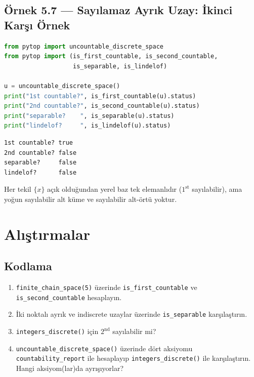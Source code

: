 \subsection*{Örnek 5.7 — Sayılamaz Ayrık Uzay: İkinci Karşı Örnek}

\begin{lstlisting}[language=Python]
from pytop import uncountable_discrete_space
from pytop import (is_first_countable, is_second_countable,
                   is_separable, is_lindelof)

u = uncountable_discrete_space()
print("1st countable?", is_first_countable(u).status)
print("2nd countable?", is_second_countable(u).status)
print("separable?    ", is_separable(u).status)
print("lindelof?     ", is_lindelof(u).status)
\end{lstlisting}

\begin{verbatim}
1st countable? true
2nd countable? false
separable?     false
lindelof?      false
\end{verbatim}

Her tekil $\{x\}$ açık olduğundan yerel baz tek elemanlıdır ($1^{\text{st}}$
sayılabilir), ama yoğun sayılabilir alt küme ve sayılabilir alt-örtü yoktur.

\section{Alıştırmalar}

\subsection*{Kodlama}

\begin{enumerate}[label=K\arabic*.]
\item \texttt{finite\_chain\_space(5)} üzerinde \texttt{is\_first\_countable} ve
      \texttt{is\_second\_countable} hesaplayın.
\item İki noktalı ayrık ve indiscrete uzaylar üzerinde \texttt{is\_separable} karşılaştırın.
\item \texttt{integers\_discrete()} için $2^{\text{nd}}$ sayılabilir mi?
\item \texttt{uncountable\_discrete\_space()} üzerinde dört aksiyomu
      \texttt{countability\_report} ile hesaplayıp \texttt{integers\_discrete()}
      ile karşılaştırın. Hangi aksiyom(lar)da ayrışıyorlar?
\end{enumerate}

